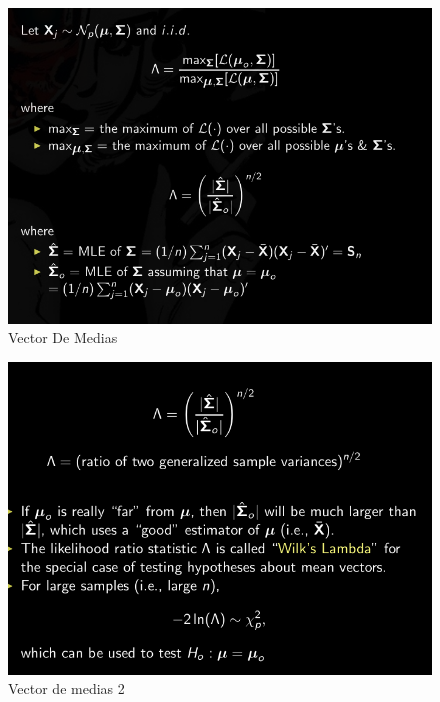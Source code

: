 \documentclass[10pt,a4paper]{article} %
\begin{document}
        \begin{figure}[h!]
            \centering
            \includegraphics[width=0.8\linewidth]{vectormedias.png}
            \caption{Vector De Medias}
            \label{fig}
        \end{figure}

        \begin{figure}[h!]
            \centering
            \includegraphics[width=0.8\linewidth]{vecm.png}
            \caption{Vector de medias 2}
            \label{fig}
        \end{figure}
\end{document}
